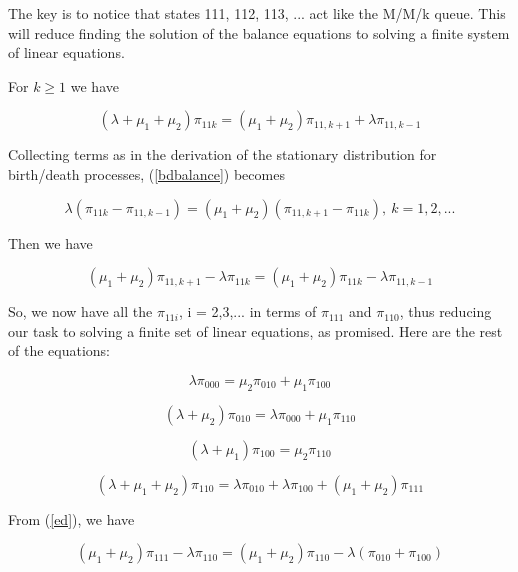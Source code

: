 The key is to notice that states 111, 112, 113, ... act like the M/M/k
queue.  This will reduce finding the solution of the balance equations
to solving a finite system of linear equations.

For $k \geq 1$ we have

\begin{equation}
\label{bdbalance}
(\lambda + \mu_1 + \mu_2) \pi_{11k} =
(\mu_1 + \mu_2) \pi_{11,k+1} +
\lambda \pi_{11,k-1}
\end{equation}

Collecting terms as in the derivation of the stationary distribution for
birth/death processes, (\ref{bdbalance}) becomes

\begin{equation}
\lambda (\pi_{11k} - \pi_{11,k-1}) =
(\mu_1+\mu_2) (\pi_{11,k+1} - \pi_{11k}), ~ k = 1,2,...
\end{equation}

Then we have

\begin{equation}
\label{bdpart}
(\mu_1+\mu_2) \pi_{11,k+1} - \lambda \pi_{11k} =
(\mu_1+\mu_2) \pi_{11k} - \lambda \pi_{11,k-1} 
\end{equation}

So, we now have all the $\pi_{11i}$, i = 2,3,... in terms of $\pi_{111}$
and $\pi_{110}$, thus reducing our task to solving a finite set of
linear equations, as promised.  Here are the rest of the equations:

\begin{equation}
\label{eea}
\lambda \pi_{000} = \mu_2 \pi_{010} + \mu_1 \pi_{100}
\end{equation}

\begin{equation}
\label{eeb}
(\lambda+\mu_2)  \pi_{010} = \lambda \pi_{000} + \mu_1 \pi_{110}
\end{equation}

\begin{equation}
\label{eec}
(\lambda+\mu_1)  \pi_{100} = \mu_2 \pi_{110}
\end{equation}

\begin{equation}
\label{eed}
(\lambda+\mu_1+\mu_2)  \pi_{110} = \lambda \pi_{010} +  \lambda \pi_{100} +
(\mu_1+\mu_2) \pi_{111}
\end{equation}

From (\ref{ed}), we have

\begin{equation}
\label{baseeqn}
(\mu_1+\mu_2) \pi_{111} - \lambda \pi_{110} =
(\mu_1+\mu_2) \pi_{110} - \lambda (\pi_{010}+\pi_{100}) 
\end{equation}

